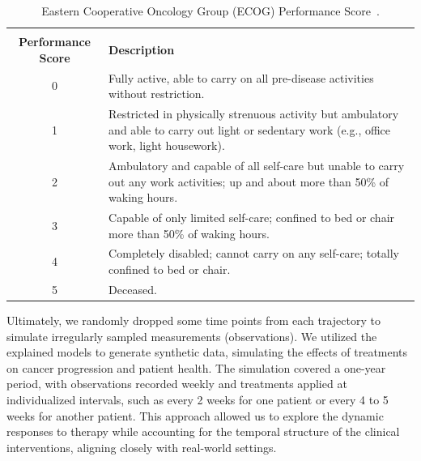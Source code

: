 \documentclass[preprint,12pt]{elsarticle}
\begin{document}
\begin{table}[h!]
    \centering
        \caption{Eastern Cooperative Oncology Group (ECOG) Performance Score~\citep{oken1982ecog}.}
\begin{small}
\begin{tabularx}{\textwidth}{cX} 
        \toprule
        \makecell{\textbf{ECOG} \\ \textbf{Performance Score}} & \textbf{Description} \\
        \midrule
        0 & Fully active, able to carry on all pre-disease activities without restriction. \\
        1 & Restricted in physically strenuous activity but ambulatory and able to carry out light or sedentary work (e.g., office work, light housework). \\
        2 & Ambulatory and capable of all self-care but unable to carry out any work activities; up and about more than 50\% of waking hours. \\
        3 & Capable of only limited self-care; confined to bed or chair more than 50\% of waking hours. \\
        4 & Completely disabled; cannot carry on any self-care; totally confined to bed or chair. \\
        5 & Deceased. \\
        \bottomrule
    \end{tabularx}
\end{small}    \label{tab:performace_score}
\end{table}

Ultimately, we randomly dropped some time points from each trajectory to simulate irregularly sampled measurements (observations).
We utilized the explained models to generate synthetic data, simulating the effects of treatments on cancer progression and patient health. The simulation covered a one-year period, with observations recorded weekly and treatments applied at individualized intervals, such as every 2 weeks for one patient or every 4 to 5 weeks for another patient. This approach allowed us to explore the dynamic responses to therapy while accounting for the temporal structure of the clinical interventions, aligning closely with real-world settings.
\end{document}
